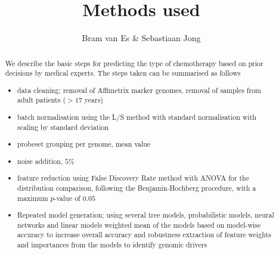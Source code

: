 \documentclass[a4paper,10pt]{article}
\title{Methods used}
\author{Bram van Es \& Sebastiaan Jong}
\begin{document}
\begin{abstract}



We describe the basic steps for predicting the type of chemotherapy based on 
prior decisions by medical experts. The steps taken can be summarised as follows
\begin{itemize}
 \item data cleaning; removal of Affimetrix marker genomes, removal of samples from adult patients ($>17$ years) 
 \item batch normalisation using the L/S method with standard normalisation with scaling by standard deviation 
 \item probeset grouping per genome, mean value
 \item noise addition, $5\%$
 \item feature reduction using False Discovery Rate method with ANOVA for the distribution comparison, following the Benjamin-Hochberg procedure, with a maximum $p$-value of $0.05$
 \item Repeated model generation; using several tree models, probabilistic models, neural networks and linear models
    \subitem weighted mean of the models based on model-wise accuracy to increase overall accuracy and robustness
    \subitem extraction of feature weights and importances from the models to identify genomic drivers
\end{itemize}
%


\end{abstract}
\end{document}
